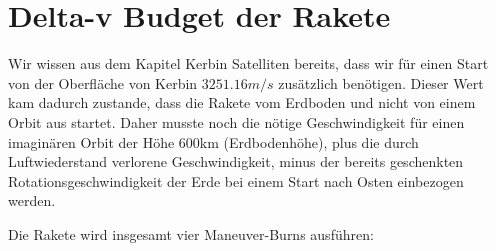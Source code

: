 \documentclass[12pt,paper=A4,numbers=noenddot,bibliography=totoc,listof=totoc,DIV=11,BCOR=1mm]{scrreprt}
\newcommand{\gq}[1]{\glqq #1\grqq} %
\begin{document}
\section{Delta-v Budget der Rakete}
Wir wissen aus dem Kapitel \gq{Kerbin Satelliten} bereits, dass wir für einen Start von der Oberfläche von Kerbin \hyperlink{kerbinrocketdrag}{$3251.16m/s$} zusätzlich benötigen. Dieser Wert kam dadurch zustande, dass die Rakete vom Erdboden und nicht von einem Orbit aus startet. Daher musste noch die nötige Geschwindigkeit für einen imaginären Orbit der Höhe 600km (Erdbodenhöhe), plus die durch Luftwiederstand verlorene Geschwindigkeit, minus der bereits geschenkten Rotationsgeschwindigkeit der Erde bei einem Start nach Osten einbezogen werden.
\begin{flushleft}
Die Rakete wird insgesamt vier Maneuver-Burns ausführen:
\end{flushleft}
\end{document}
